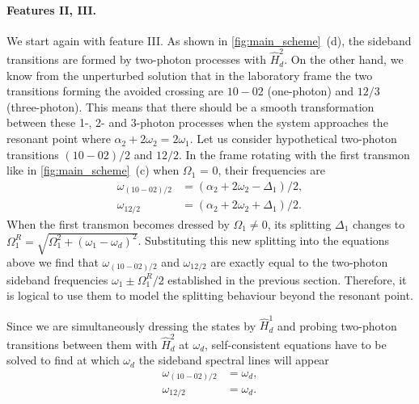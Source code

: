\documentclass[%
 aps, prx,
 amsmath,amssymb,
 reprint,%
superscriptaddress
]{revtex4-2}
\begin{document}
\paragraph{Features II, III.} We start again with feature III. As shown in 
\autoref{fig:main_scheme}~(d), the sideband 
transitions are formed by two-photon processes 
with $\hat H_d^2$. On the other hand, we know from 
the unperturbed solution that in the laboratory 
frame the two transitions forming the avoided 
crossing are $10 - 02$ (one-photon) and $12/3$ 
(three-photon). This means that there should be a 
smooth transformation between these 1-, 2- and 3-photon 
processes when the system approaches the resonant 
point where $\alpha_2 + 2 \omega_{2} = 2\omega_1$. Let us consider hypothetical two-photon transitions $(10 
- 02)/2$ and $12/2$. In the frame rotating with 
the first transmon like in 
\autoref{fig:main_scheme}~(c) when $\Omega_1$ = 
0, their 
frequencies are
\begin{equation}
\begin{aligned}
\omega_{(10-02)/2} &= (\alpha_2 + 2 \omega_{2} - \Delta_1)/2,\\
 \omega_{12/2} &= (\alpha_2 + 2 \omega_{2} + \Delta_1)/2.
\end{aligned}
\label{eq:two-photon_lab}
\end{equation}
When the first transmon becomes dressed by $\Omega_1 \neq 0$, its splitting $\Delta_1$ changes to $\Omega^R_1 =\sqrt{\Omega_{1}^2 + \left(\omega_{1} - \omega_{d}\right)^{2}}$. Substituting this new splitting into the equations above we find that $\omega_{(10-02)/2}$ and $\omega_{12/2}$ are exactly equal to the two-photon sideband frequencies $\omega_1 \pm \Omega_1^R/2$ established in the previous section. Therefore, it is logical to use them to model the splitting behaviour beyond the resonant point.

Since we are simultaneously dressing the states by $\hat H_d^1$ and probing two-photon transitions between them with $\hat H_d^2$ at $\omega_d$, self-consistent equations have to be solved to find at which $\omega_d$ the sideband spectral lines will appear
\begin{equation}
\begin{aligned}
\omega_{(10-02)/2} &= \omega_d,\\
\omega_{12/2} &= \omega_d.
\end{aligned}
\label{eq:two-photon}
\end{equation}
\end{document}
